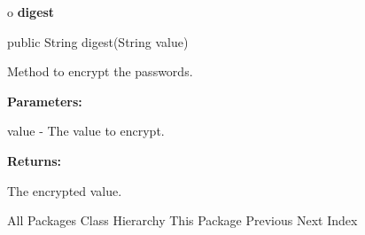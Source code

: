 o {\bf digest} 

\begin{PRE}
 public String digest(String value)
\end{PRE}

\begin{description}
\htmlDD Method to encrypt the passwords. 

\begin{description}
\item {\bf Parameters:}  

value - The value to encrypt.  
\item {\bf Returns:}  

The encrypted value.  
\end{description}

\end{description}

\htmlHR

\begin{PRE}
All Packages  Class Hierarchy  This Package  Previous  Next  Index
\end{PRE}

